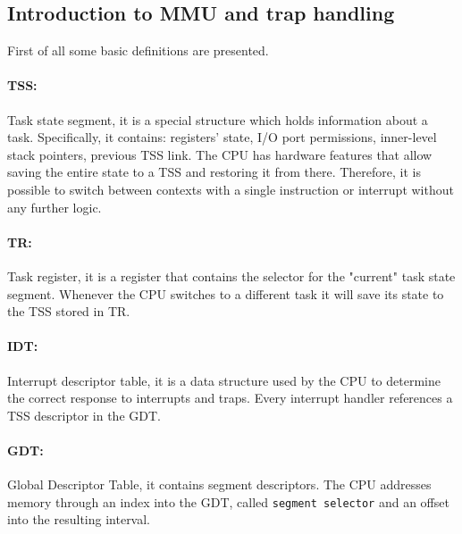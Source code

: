 \documentclass[11pt,twoside,a4paper]{article}
\begin{document}
\subsection{Introduction to MMU and trap handling}

First of all some basic definitions are presented.


\paragraph{TSS: } Task state segment, it is a special structure which holds information about a task. Specifically, it contains: registers' state, I/O port permissions, inner-level stack pointers, previous TSS link. The CPU has hardware features that allow saving the entire state to a TSS and restoring it from there. Therefore, it is possible to switch between contexts with a single instruction or interrupt without any further logic.

\paragraph{TR: } Task register, it is a register that contains the selector for the "current" task state segment. Whenever the CPU switches to a different task it will save its state to the TSS stored in TR.

\paragraph{IDT: } Interrupt descriptor table, it is a data structure used by the CPU to determine the correct response to interrupts and traps. Every interrupt handler references a TSS descriptor in the GDT.

\paragraph{GDT: } Global Descriptor Table, it contains segment descriptors. The CPU addresses memory through an index into the GDT, called \texttt{segment selector} and an offset into the resulting interval.
\end{document}
